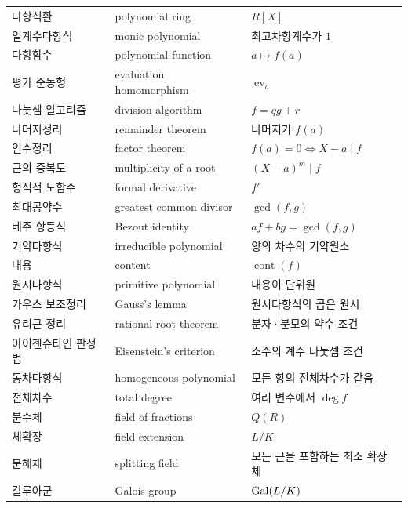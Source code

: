 \begin{longtable}{>{\raggedright\arraybackslash}p{}>{\raggedright\arraybackslash}p{}p{}}
\addlinespace
다항식환 & polynomial ring & $R[X]$ \\
일계수다항식 & monic polynomial & 최고차항계수가 $1$ \\
다항함수 & polynomial function & $a\mapsto f(a)$ \\
평가 준동형 & evaluation homomorphism & $\operatorname{ev}_a$ \\
나눗셈 알고리즘 & division algorithm & $f=qg+r$ \\
나머지정리 & remainder theorem & 나머지가 $f(a)$ \\
인수정리 & factor theorem & $f(a)=0\Leftrightarrow X-a\mid f$ \\
근의 중복도 & multiplicity of a root & $(X-a)^m\mid f$ \\
형식적 도함수 & formal derivative & $f'$ \\
최대공약수 & greatest common divisor & $\gcd(f,g)$ \\
베주 항등식 & Bezout identity & $af+bg=\gcd(f,g)$ \\
기약다항식 & irreducible polynomial & 양의 차수의 기약원소 \\
내용 & content & $\operatorname{cont}(f)$ \\
원시다항식 & primitive polynomial & 내용이 단위원 \\
가우스 보조정리 & Gauss's lemma & 원시다항식의 곱은 원시 \\
유리근 정리 & rational root theorem & 분자·분모의 약수 조건 \\
아이젠슈타인 판정법 & Eisenstein's criterion & 소수의 계수 나눗셈 조건 \\
동차다항식 & homogeneous polynomial & 모든 항의 전체차수가 같음 \\
전체차수 & total degree & 여러 변수에서 $\deg f$ \\
분수체 & field of fractions & $Q(R)$ \\
체확장 & field extension & $L/K$ \\
분해체 & splitting field & 모든 근을 포함하는 최소 확장체 \\
갈루아군 & Galois group & $\operatorname{Gal}(L/K)$ \\

\end{longtable}
